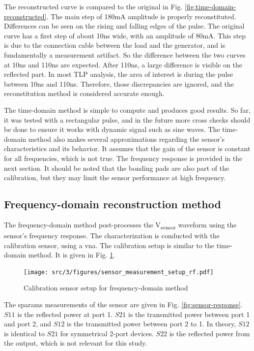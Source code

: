 The reconstructed curve is compared to the original in Fig. \ref{fig:time-domain-reconstructed}.
The main step of 180mA amplitude is properly reconstituted.
Differences can be seen on the rising and falling edges of the pulse.
The original curve has a first step of about 10ns wide, with an amplitude of 80mA.
This step is due to the connection cable between the load and the generator, and is fundamentally a measurement artifact.
So the difference between the two curves at 10ns and 110ns are expected.
After 110ns, a large difference is visible on the reflected part.
In most TLP analysis, the area of interest is during the pulse between 10ns and 110ns.
Therefore, those discrepancies are ignored, and the reconstitution method is considered accurate enough.

The time-domain method is simple to compute and produces good results.
So far, it was tested with a rectangular pulse, and in the future more cross checks should be done to ensure it works with dynamic signal such as sine waves.
The time-domain method also makes several approximations regarding the sensor's characteristics and its behavior.
It assumes that the gain of the sensor is constant for all frequencies, which is not true.
The frequency response is provided in the next section.
It should be noted that the bonding pads are also part of the calibration, but they may limit the sensor performance at high frequency.

\subsection{Frequency-domain reconstruction method}

The frequency-domain method post-processes the V\textsubscript{sensor} waveform using the sensor's frequency response.
The characterization is conducted with the calibration sensor, using a \gls{vna}.
The calibration setup is similar to the time-domain method.
It is given in Fig. \ref{fig:calibration-sensor-rf}.

\begin{figure}[!h]
  \centering
  \texttt{[image: src/3/figures/sensor\_measurement\_setup\_rf.pdf]}
  \caption{Calibration sensor setup for frequency-domain method}
  \label{fig:calibration-sensor-rf}
\end{figure}

The \gls{sparams} measurements of the sensor are given in Fig. \ref{fig:sensor-response}.
$S11$ is the reflected power at port 1.
$S21$ is the transmitted power between port 1 and port 2, and $S12$ is the transmitted power between port 2 to 1.
In theory, $S12$ is identical to $S21$ for symmetrical 2-port devices.
$S22$ is the reflected power from the output, which is not relevant for this study.

